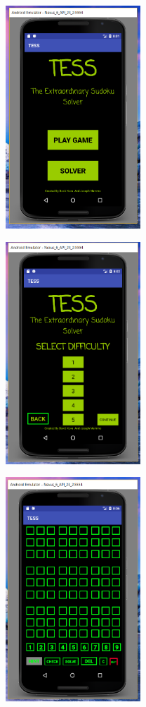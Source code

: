 \documentclass{article}
\begin{document}
\begin{figure}[H]
\centering
\begin{minipage}{.5\textwidth} \centering \includegraphics[width=2.0in]{./Figure/Main.PNG} \label{fig:MainPage}
\end{minipage}%
\begin{minipage}{.5\textwidth}\centering \includegraphics[width=2.0in]{./Figure/Play.PNG} \label{fig:playPage}
\end{minipage}%
\par\medskip\par\medskip
\begin{minipage}{.5\textwidth} \centering \includegraphics[width=2.0in]{./Figure/Solver.PNG} \label{fig:solverPage}

\end{minipage}
\end{figure}
\end{document}
